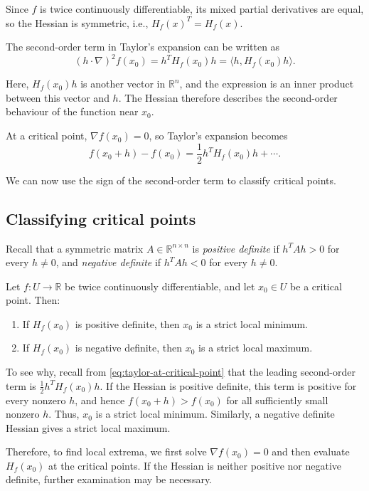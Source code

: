 Since $f$ is twice continuously differentiable, its mixed partial derivatives are equal, so the Hessian is symmetric, i.e., $H_f(x)^T=H_f(x)$.

The second-order term in Taylor's expansion can be written as
\begin{equation}
	(h\cdot\nabla)^2f(x_0)=h^TH_f(x_0)h=\langle h,H_f(x_0)h\rangle.
	\label{eq:second-order-hessian}
\end{equation}

Here, $H_f(x_0)h$ is another vector in $\mathbb{R}^n$, and the expression is an inner product between this vector and $h$. The Hessian therefore describes the second-order behaviour of the function near $x_0$.

At a critical point, $\nabla f(x_0)=0$, so Taylor's expansion becomes
\begin{equation}
	f(x_0+h)-f(x_0)=\frac12h^TH_f(x_0)h+\cdots.
	\label{eq:taylor-at-critical-point}
\end{equation}

We can now use the sign of the second-order term to classify critical points.

\subsection{Classifying critical points}

Recall that a symmetric matrix $A\in\mathbb{R}^{n\times n}$ is \emph{positive definite} if $h^TAh>0$ for every $h\neq 0$, and \emph{negative definite} if $h^TAh<0$ for every $h\neq 0$.

\begin{proposition}
	Let $f:U\to\mathbb{R}$ be twice continuously differentiable, and let $x_0\in U$ be a critical point. Then:
	\begin{enumerate}
		\item If $H_f(x_0)$ is positive definite, then $x_0$ is a strict local minimum.
		\item If $H_f(x_0)$ is negative definite, then $x_0$ is a strict local maximum.
	\end{enumerate}
\end{proposition}

To see why, recall from \autoref{eq:taylor-at-critical-point} that the leading second-order term is $\frac12h^TH_f(x_0)h$. If the Hessian is positive definite, this term is positive for every nonzero $h$, and hence $f(x_0+h)>f(x_0)$ for all sufficiently small nonzero $h$. Thus, $x_0$ is a strict local minimum. Similarly, a negative definite Hessian gives a strict local maximum.

Therefore, to find local extrema, we first solve $\nabla f(x_0)=0$ and then evaluate $H_f(x_0)$ at the critical points. If the Hessian is neither positive nor negative definite, further examination may be necessary.

